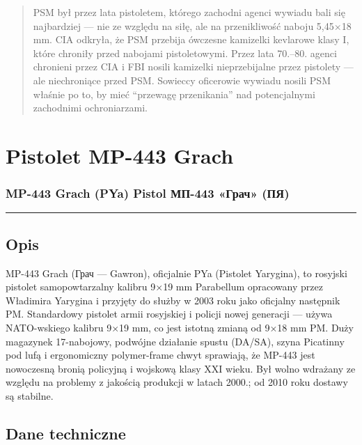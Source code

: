 \documentclass[12pt,openany,oneside]{book}
\begin{document}
\begin{quote}
PSM był przez lata pistoletem, którego zachodni agenci wywiadu bali się
najbardziej --- nie ze względu na siłę, ale na przenikliwość naboju
5,45×18 mm. CIA odkryła, że PSM przebija ówczesne kamizelki kevlarowe
klasy I, które chroniły przed nabojami pistoletowymi. Przez lata
70.--80. agenci chronieni przez CIA i FBI nosili kamizelki
nieprzebijalne przez pistolety --- ale niechroniące przed PSM. Sowieccy
oficerowie wywiadu nosili PSM właśnie po to, by mieć ``przewagę
przenikania'' nad potencjalnymi zachodnimi ochroniarzami.
\end{quote}

\chapter{Pistolet MP-443 Grach}\label{pistolet-mp-443-grach}

\subsection{MP-443 Grach (PYa) Pistol \textbar{} МП-443 «Грач»
(ПЯ)}\label{mp-443-grach-pya-pistol-ux43cux43f-443-ux433ux440ux430ux447-ux43fux44f}

\begin{center}\rule{0.5\linewidth}{0.5pt}\end{center}

\section{Opis}\label{opis-91}

MP-443 Grach (Грач --- Gawron), oficjalnie PYa (Pistolet Yarygina), to
rosyjski pistolet samopowtarzalny kalibru 9×19 mm Parabellum opracowany
przez Władimira Yarygina i przyjęty do służby w 2003 roku jako oficjalny
następnik PM. Standardowy pistolet armii rosyjskiej i policji nowej
generacji --- używa NATO-wskiego kalibru 9×19 mm, co jest istotną zmianą
od 9×18 mm PM. Duży magazynek 17-nabojowy, podwójne działanie spustu
(DA/SA), szyna Picatinny pod lufą i ergonomiczny polymer-frame chwyt
sprawiają, że MP-443 jest nowoczesną bronią policyjną i wojskową klasy
XXI wieku. Był wolno wdrażany ze względu na problemy z jakością
produkcji w latach 2000.; od 2010 roku dostawy są stabilne.

\section{Dane techniczne}\label{dane-techniczne-91}
\end{document}
